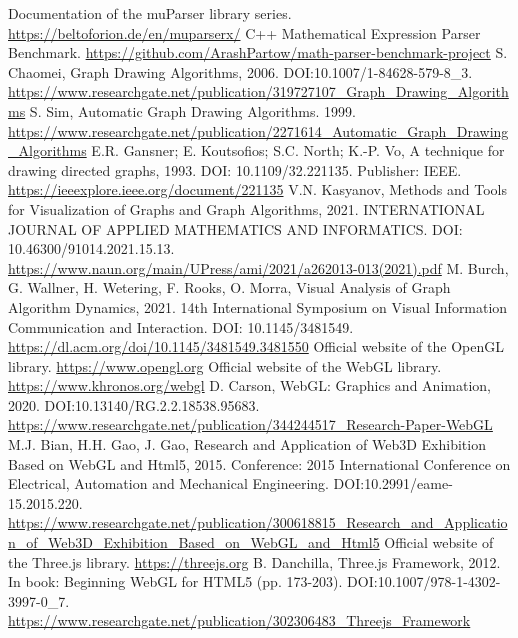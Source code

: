 \begin{thebibliography}{}
Documentation of the muParser library series. \url{https://beltoforion.de/en/muparserx/}
C++ Mathematical Expression Parser Benchmark. \url{https://github.com/ArashPartow/math-parser-benchmark-project}
S. Chaomei, Graph Drawing Algorithms, 2006. DOI:10.1007/1-84628-579-8\_3. \url{https://www.researchgate.net/publication/319727107\_Graph\_Drawing\_Algorithms}
S. Sim, Automatic Graph Drawing Algorithms. 1999. \url{https://www.researchgate.net/publication/2271614\_Automatic\_Graph\_Drawing\_Algorithms}
E.R. Gansner; E. Koutsofios; S.C. North; K.-P. Vo, A technique for drawing directed graphs, 1993. DOI: 10.1109/32.221135. Publisher: IEEE. \url{https://ieeexplore.ieee.org/document/221135}
V.N. Kasyanov, Methods and Tools for Visualization of Graphs and Graph Algorithms, 2021. INTERNATIONAL JOURNAL OF APPLIED MATHEMATICS AND INFORMATICS. DOI: 10.46300/91014.2021.15.13. \url{https://www.naun.org/main/UPress/ami/2021/a262013-013(2021).pdf}
M. Burch, G. Wallner, H. Wetering, F. Rooks, O. Morra, Visual Analysis of Graph Algorithm Dynamics, 2021. 14th International Symposium on Visual Information Communication and Interaction. DOI: 10.1145/3481549. \url{https://dl.acm.org/doi/10.1145/3481549.3481550}
Official website of the OpenGL library. \url{https://www.opengl.org}
Official website of the WebGL library. \url{https://www.khronos.org/webgl}
D. Carson, WebGL: Graphics and Animation, 2020. DOI:10.13140/RG.2.2.18538.95683. \url{https://www.researchgate.net/publication/344244517\_Research-Paper-WebGL}
M.J. Bian, H.H. Gao, J. Gao, Research and Application of Web3D Exhibition Based on WebGL and Html5, 2015. Conference: 2015 International Conference on Electrical, Automation and Mechanical Engineering. DOI:10.2991/eame-15.2015.220. \url{https://www.researchgate.net/publication/300618815\_Research\_and\_Application\_of\_Web3D\_Exhibition\_Based\_on\_WebGL\_and\_Html5}
Official website of the Three.js library. \url{https://threejs.org}
B. Danchilla, Three.js Framework, 2012. In book: Beginning WebGL for HTML5 (pp. 173-203). DOI:10.1007/978-1-4302-3997-0\_7. \url{https://www.researchgate.net/publication/302306483\_Threejs\_Framework}

\end{thebibliography}
